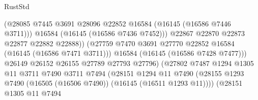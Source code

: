 \begin{lexlean}{RustStd}
\begin{coremodule}
                                              (@28085
                                                @7445
                                                @3691
                                                @28096
                                                @22852
                                                @16584
                                                (@16145 (@16586 @7446 @3711)))
                                              @16584
                                              (@16145 (@16586 @7436 @7452)))
                                            @22867
                                            @22870
                                            @22873
                                            @22877
                                            @22882
                                            @22888))
                                        (@27759
                                          @7470
                                          @3691
                                          @27770
                                          @22852
                                          @16584
                                          (@16145 (@16586 @7471 @3711)))
                                        @16584
                                        (@16145 (@16586 @7428 @7477)))
                                      @26149
                                      @26152
                                      @26155
                                      @27789
                                      @27793
                                      @27796)
                                    (@27802
                                      @7487
                                      @1294
                                      @1305
                                      @11
                                      @3711
                                      @7490
                                      @3711
                                      @7494
                                      (@28151
                                        @1294
                                        @11
                                        @7490
                                        (@28155
                                          @1293
                                          @7490
                                          (@16505 (@16506 @7490))
                                          (@16145 (@16511 @1293 @11))))
                                      (@28151
                                        @1305
                                        @11
                                        @7494

\end{coremodule}
\end{lexlean}
